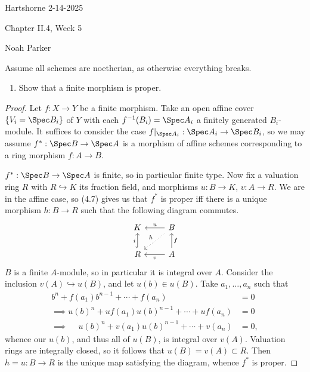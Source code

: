 \documentclass[12pt]{amsart}
\begin{document}
{Hartshorne} \hfill {2-14-2025}

\bigskip\bigskip

\begin{center}

{\sc Chapter II.4, Week 5}

\end{center}

\begin{center}

  {Noah Parker} %
    
\end{center}

\bigskip
Assume all schemes are noetherian, as otherwise everything breaks.
\bigskip


\begin{enumerate}
  \item[4.1.] {
      Show that a finite morphism is proper.
    }
\end{enumerate}

\begin{proof}
  Let $f:X\to Y$ be a finite morphism.
  Take an open affine cover $\{V_i=\Spec B_i\}$ of $Y$ with each $f^{-1}(B_i)=\Spec A_i$ a finitely generated $B_i$-module.
  It suffices to consider the case $f|_{\Spec A_i}:\Spec A_i\to \Spec B_i$, so we may assume $f^*:\Spec B\to \Spec A$ is a morphism of affine schemes corresponding to a ring morphism $f:A\to B$.
  
  $f^*:\Spec B\to \Spec A$ is finite, so in particular finite type.
  Now fix a valuation ring $R$ with $R\hookrightarrow K$ its fraction field, and morphisms $u:B\to K$, $v:A\to R$.
  We are in the affine case, so (4.7) gives us that $f^*$ is proper iff there is a unique morphism $h:B\to R$ such that the following diagram commutes.
  \[
    \begin{tikzcd}
      K & B\ar[l,"u"']\ar[dl,dotted,"h"'] \\
      R\ar[u,hook,"i"] & A\ar[l,"v"]\ar[u,"f"']
    \end{tikzcd}
  \] 
  $B$ is a finite $A$-module, so in particular it is integral over $A$.
  Consider the inclusion $v(A)\hookrightarrow u(B)$, and let $u(b)\in u(B)$.
  Take $a_1,\ldots, a_n$ such that
  \begin{align*}
    b^n + f(a_1)b^{n-1}+\cdots +f(a_n) &= 0 \\
    \implies u(b)^n +uf(a_1)u(b)^{n-1}+\cdots+uf(a_n)&= 0 \\
    \implies~\;~\;~ u(b)^n + v(a_1)u(b)^{n-1}+\cdots + v(a_n)&=0,
  \end{align*}
  whence our $u(b)$, and thus all of $u(B)$, is integral over $v(A)$.
  Valuation rings are integrally closed, so it follows that $u(B)=v(A)\subset R$.
  Then $h=u:B\to R$ is the unique map satisfying the diagram, whence $f^*$ is proper.
\end{proof}
\end{document}

